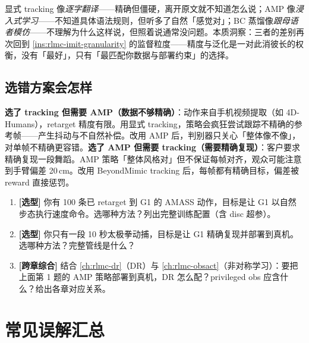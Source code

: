 \begin{insight}[三种方法像学外语的三种方式]\label{ins:rlmc-imit-language}
显式 tracking 像\emph{逐字翻译}——精确但僵硬，离开原文就不知道怎么说；AMP 像\emph{浸入式学习}——不知道具体语法规则，但听多了自然「感觉对」；BC 蒸馏像\emph{跟母语者模仿}——不理解为什么这样说，但照着说通常没问题。本质洞察：三者的差别再次回到 \cref{ins:rlmc-imit-granularity} 的监督粒度——精度与泛化是一对此消彼长的权衡，没有「最好」，只有「最匹配你数据与部署约束」的选择。
\end{insight}

\subsection{选错方案会怎样}
\label{sec:rlmc-imit-choose-wrong}

\textbf{选了 tracking 但需要 AMP（数据不够精确）}：动作来自手机视频提取（如 4D-Humans），retarget 精度有限。用显式 tracking，策略会疯狂尝试跟踪不精确的参考帧——产生抖动与不自然补偿。改用 AMP 后，判别器只关心「整体像不像」，对单帧不精确更容错。\textbf{选了 AMP 但需要 tracking（需要精确复现）}：客户要求精确复现一段舞蹈。AMP 策略「整体风格对」但不保证每帧对齐，观众可能注意到手臂偏差 20\,cm。改用 BeyondMimic tracking 后，每帧都有精确目标，偏差被 reward 直接惩罚。

\begin{practice}[练习·选型]
\begin{enumerate}
  \item \textbf{[选型]} 你有 100 条已 retarget 到 G1 的 AMASS 动作，目标是让 G1 以自然步态执行速度命令。选哪种方法？列出完整训练配置（含 disc 超参）。
  \item \textbf{[选型]} 你只有一段 10 秒太极拳动捕，目标是让 G1 精确复现并部署到真机。选哪种方法？完整管线是什么？
  \item \textbf{[跨章综合]} 结合 \cref{ch:rlmc-dr}（DR）与 \cref{ch:rlmc-obsact}（非对称学习）：要把上面第 1 题的 AMP 策略部署到真机，DR 怎么配？privileged obs 应含什么？给出各章对应关系。
\end{enumerate}
\end{practice}

\section*{常见误解汇总}
\label{sec:rlmc-imit-misconceptions}

